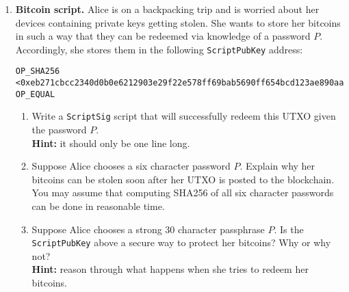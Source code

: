 \documentclass[11pt]{article}
\newenvironment{problems}
{\begin{enumerate}[label=\bfseries Problem \arabic*.,align=left,leftmargin=1em,labelwidth=1.5em]}
{\end{enumerate}}
\newenvironment{subparts}
{\begin{enumerate}[label=\bfseries \alph*.,align=right,leftmargin=1.5em]}
{\end{enumerate}}
\begin{document}
\begin{problems}
\begin{subparts}
\item 
For large $n$, if we want to minimize the length of the proof, is it better
to use a binary or a ternary tree?  Why?

\end{subparts}

\newpage
\item {\bf Bitcoin script.}  Alice is on a backpacking trip and is
  worried about her devices containing private keys getting stolen. 
  She wants to store her bitcoins in such a way that they can be
  redeemed via knowledge of a password $P$. Accordingly, she stores
  them in the following {\tt ScriptPubKey} address:
\begin{center}
\begin{verbatim}
OP_SHA256
<0xeb271cbcc2340d0b0e6212903e29f22e578ff69bab5690ff654bcd123ae890aa>
OP_EQUAL
\end{verbatim}
\end{center}


\begin{subparts}
\item
Write a {\tt ScriptSig} script that will successfully redeem this
UTXO given the password $P$. \\
{\bf Hint:} it should only be one line long.

\item
Suppose Alice chooses a six character password $P$.
Explain why her bitcoins can be stolen soon after her UTXO is posted
to the blockchain. 
You may assume that computing SHA256 of all six character passwords
can be done in reasonable time.  


\item
Suppose Alice chooses a strong 30 character passphrase $P$.  
Is the {\tt ScriptPubKey} above a secure way to protect her bitcoins?
Why or why not?  \\
{\bf Hint:} reason through what happens when she tries to redeem her bitcoins.


\end{subparts}



\end{problems}
\end{document}
